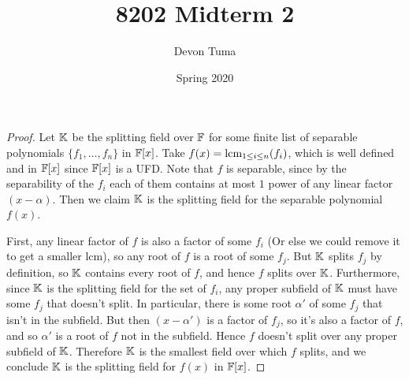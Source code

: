 \documentclass[11pt]{article}
\title{8202 Midterm 2}
\author{Devon Tuma}
\date{Spring 2020}
\begin{document}
\maketitle

\begin{proof}
  Let $\mathbb{K}$ be the splitting field over $\mathbb{F}$ for some finite list of separable polynomials $\{f_1,\dots,f_n\}$ in $\mathbb{F}[x]$.
  Take $f(x) = \text{lcm}_{1 \le i \le n}(f_i)$, which is well defined and in $\mathbb{F}[x]$ since $\mathbb{F}[x]$ is a UFD.
  Note that $f$ is separable, since by the separability of the $f_i$ each of them contains at most $1$ power of any linear factor $(x-\alpha)$.
  Then we claim $\mathbb{K}$ is the splitting field for the separable polynomial $f(x)$.
  
  First, any linear factor of $f$ is also a factor of some $f_i$ (Or else we could remove it to get a smaller lcm), so any root of $f$ is a root of some $f_j$.
  But $\mathbb{K}$ splits $f_j$ by definition, so $\mathbb{K}$ contains every root of $f$, and hence $f$ splits over $\mathbb{K}$.
  Furthermore, since $\mathbb{K}$ is the splitting field for the set of $f_i$, any proper subfield of $\mathbb{K}$ must have some $f_j$ that doesn't split.
  In particular, there is some root $\alpha'$ of some $f_j$ that isn't in the subfield.
  But then $(x-\alpha')$ is a factor of $f_j$, so it's also a factor of $f$, and so $\alpha'$ is a root of $f$ not in the subfield.
  Hence $f$ doesn't split over any proper subfield of $\mathbb{K}$.
  Therefore $\mathbb{K}$ is the smallest field over which $f$ splits, and we conclude $\mathbb{K}$ is the splitting field for $f(x)$ in $\mathbb{F}[x]$.
\end{proof}
\end{document}
